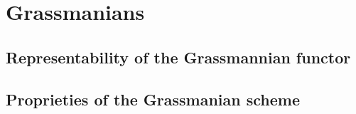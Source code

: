 \chapter{Grassmanians}

\section{Representability of the Grassmannian functor}

\section{Proprieties of the Grassmanian scheme}
